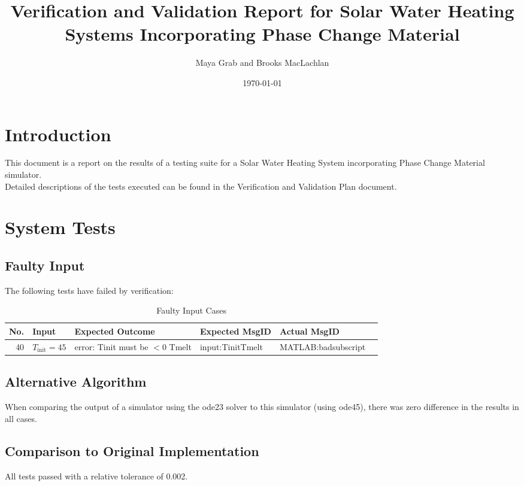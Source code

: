 \documentclass[12pt]{article}
\begin{document}
\title{Verification and Validation Report for Solar Water Heating Systems
  Incorporating Phase Change Material} 
\author{Maya Grab and Brooks MacLachlan}
\date{\today}
	
\maketitle

\tableofcontents

\section{Introduction}
This document is a report on the results of a testing suite for a Solar Water 
Heating System incorporating Phase Change Material simulator.
\\Detailed descriptions of the tests executed can be found in the Verification 
and Validation Plan document.

\section{System Tests}

\subsection{Faulty Input}
The following tests have failed by verification:

\begin{center}
	\begin{longtable}{ | r | p{3cm} | p{4cm} | p{4cm} | p{4cm} | p{4cm}|}
	\caption{Faulty Input Cases} \\ \hline \label{TblInputVar} 
	No. & Input & Expected Outcome & Expected MsgID & Actual MsgID \\ \hline
	40 & $T_{\text{init}} = 45$ &error: Tinit must be $< 0$ Tmelt & input:TinitTmelt & MATLAB:badsubscript \\ \hline
	\end{longtable}
\end{center}

\subsection{Alternative Algorithm}
When comparing the output of a simulator using the ode23 solver to this simulator (using ode45), there was zero difference in the results in all cases.

\subsection{Comparison to Original Implementation}
All tests passed with a relative tolerance of 0.002.
\end{document}
